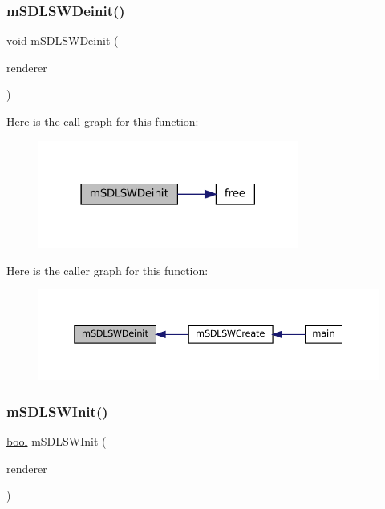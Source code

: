 \subsubsection{\texorpdfstring{m\+S\+D\+L\+S\+W\+Deinit()}{mSDLSWDeinit()}}
{\footnotesize\ttfamily void m\+S\+D\+L\+S\+W\+Deinit (\begin{DoxyParamCaption}\item[{struct \mbox{\hyperlink{structm_s_d_l_renderer}{m\+S\+D\+L\+Renderer}} $\ast$}]{renderer }\end{DoxyParamCaption})\hspace{0.3cm}{\ttfamily [static]}}

Here is the call graph for this function\+:
\nopagebreak
\begin{figure}[H]
\begin{center}
\leavevmode
\includegraphics[width=242pt]{sw-sdl_8c_a7ecb29d26edf8f1b3dfbec39f86d0310_cgraph}
\end{center}
\end{figure}
Here is the caller graph for this function\+:
\nopagebreak
\begin{figure}[H]
\begin{center}
\leavevmode
\includegraphics[width=350pt]{sw-sdl_8c_a7ecb29d26edf8f1b3dfbec39f86d0310_icgraph}
\end{center}
\end{figure}
\mbox{\label{sw-sdl_8c_aac002ada1b387a89102bceb5e2b2b9b9}} 
\subsubsection{\texorpdfstring{m\+S\+D\+L\+S\+W\+Init()}{mSDLSWInit()}}
{\footnotesize\ttfamily \mbox{\hyperlink{libretro_8h_a4a26dcae73fb7e1528214a068aca317e}{bool}} m\+S\+D\+L\+S\+W\+Init (\begin{DoxyParamCaption}\item[{struct \mbox{\hyperlink{structm_s_d_l_renderer}{m\+S\+D\+L\+Renderer}} $\ast$}]{renderer }\end{DoxyParamCaption})\hspace{0.3cm}{\ttfamily [static]}}

